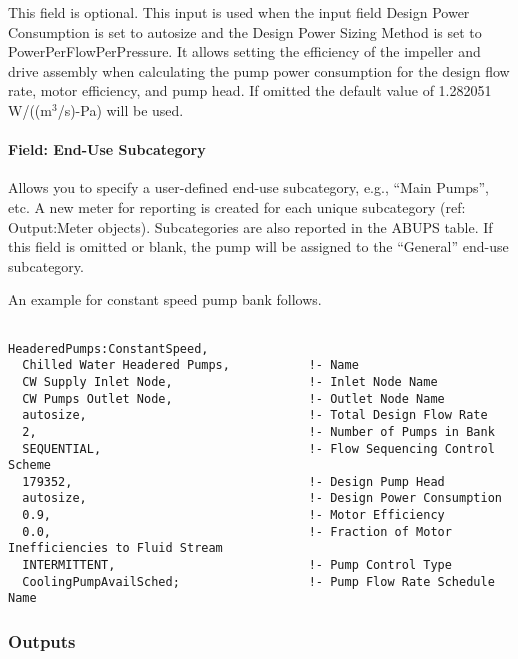 This field is optional. This input is used when the input field Design Power Consumption is set to autosize and the Design Power Sizing Method is set to PowerPerFlowPerPressure. It allows setting the efficiency of the impeller and drive assembly when calculating the pump power consumption for the design flow rate, motor efficiency, and pump head. If omitted the default value of 1.282051 W/((m\(^{3}\)/s)-Pa) will be used.

\paragraph{Field: End-Use Subcategory}

Allows you to specify a user-defined end-use subcategory, e.g., ``Main Pumps'', etc. A new meter for reporting is created for each unique subcategory (ref: Output:Meter objects). Subcategories are also reported in the ABUPS table. If this field is omitted or blank, the pump will be assigned to the ``General'' end-use subcategory.

An example for constant speed pump bank follows.

\begin{lstlisting}

HeaderedPumps:ConstantSpeed,
  Chilled Water Headered Pumps,           !- Name
  CW Supply Inlet Node,                   !- Inlet Node Name
  CW Pumps Outlet Node,                   !- Outlet Node Name
  autosize,                               !- Total Design Flow Rate
  2,                                      !- Number of Pumps in Bank
  SEQUENTIAL,                             !- Flow Sequencing Control Scheme
  179352,                                 !- Design Pump Head
  autosize,                               !- Design Power Consumption
  0.9,                                    !- Motor Efficiency
  0.0,                                    !- Fraction of Motor Inefficiencies to Fluid Stream
  INTERMITTENT,                           !- Pump Control Type
  CoolingPumpAvailSched;                  !- Pump Flow Rate Schedule Name
\end{lstlisting}

\subsubsection{Outputs}\label{outputs-3-014}

